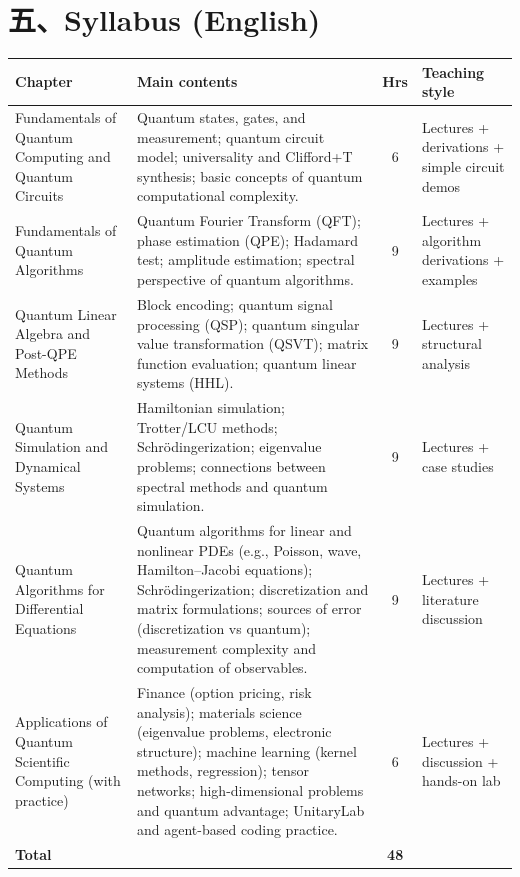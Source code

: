 \documentclass[UTF8,11pt]{ctexart}
\begin{document}
\section*{五、Syllabus (English)}
\begin{tabularx}{\textwidth}{@{}p{3.2cm} Y c p{3.1cm}@{}}
\toprule
\textbf{Chapter} & \textbf{Main contents} & \textbf{Hrs} & \textbf{Teaching style} \\
\midrule
Fundamentals of Quantum Computing and Quantum Circuits &
Quantum states, gates, and measurement; quantum circuit model; universality and Clifford+T
synthesis; basic concepts of quantum computational complexity. &
6 & Lectures + derivations + simple circuit demos \\
Fundamentals of Quantum Algorithms &
Quantum Fourier Transform (QFT); phase estimation (QPE); Hadamard test; amplitude estimation;
spectral perspective of quantum algorithms. &
9 & Lectures + algorithm derivations + examples \\
Quantum Linear Algebra and Post-QPE Methods &
Block encoding; quantum signal processing (QSP); quantum singular value transformation (QSVT);
matrix function evaluation; quantum linear systems (HHL). &
9 & Lectures + structural analysis \\
Quantum Simulation and Dynamical Systems &
Hamiltonian simulation; Trotter/LCU methods; Schr\"odingerization; eigenvalue problems;
connections between spectral methods and quantum simulation. &
9 & Lectures + case studies \\
Quantum Algorithms for Differential Equations &
Quantum algorithms for linear and nonlinear PDEs (e.g., Poisson, wave, Hamilton--Jacobi
equations); Schr\"odingerization; discretization and matrix formulations; sources of error
(discretization vs quantum); measurement complexity and computation of observables. &
9 & Lectures + literature discussion \\
Applications of Quantum Scientific Computing (with practice) &
Finance (option pricing, risk analysis); materials science (eigenvalue problems, electronic
structure); machine learning (kernel methods, regression); tensor networks; high-dimensional problems and quantum
advantage; UnitaryLab and agent-based coding practice. &
6 & Lectures + discussion + hands-on lab \\
\midrule
\textbf{Total} & & \textbf{48} & \\
\bottomrule
\end{tabularx}
\end{document}
